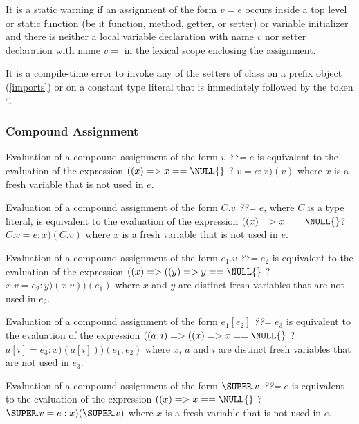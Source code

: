 \documentclass{article}
\begin{document}
\begin{itemize}

\LMHash{}
It is a static warning if an assignment of the form $v = e$ occurs inside a top level or static function (be it function, method, getter, or setter) or variable initializer and there is neither a local variable declaration with name $v$  nor setter declaration with name $v=$ in the lexical scope enclosing the assignment.

\LMHash{}
It is a compile-time error to invoke any of the setters of class  on a prefix object (\ref{imports}) or on a constant type literal that is  immediately followed by the token `.'.



\subsubsection{Compound Assignment}

\LMHash{}
Evaluation of a compound assignment of the form $v$ {\em ??=} $e$ is equivalent to the evaluation of the expression  $((x) => x == \NULL{}$ ?  $v=e : x)(v)$ where $x$ is a fresh variable that is not used in $e$.

\LMHash{}
Evaluation of a compound assignment of the form $C.v$ {\em ??=} $e$, where $C$ is a type literal, is equivalent to the evaluation of the expression  $((x) => x == \NULL{}$?  $C.v=e: x)(C.v)$ where $x$ is a fresh variable that is not used in $e$.


\LMHash{}
Evaluation of a compound assignment of the form $e_1.v$ {\em ??=} $e_2$ is equivalent to the evaluation of the expression  $((x) =>((y) => y == \NULL{}$ ? $ x.v = e_2: y)(x.v))(e_1)$ where $x$ and $y$ are distinct fresh variables that are not used in $e_2$.

\LMHash{}
Evaluation of a compound assignment of the form  $e_1[e_2]$  {\em ??=} $e_3$ is equivalent to the evaluation of the expression
$((a, i) => ((x) => x == \NULL{}$ ?  $a[i] = e_3: x)(a[i]))(e_1, e_2)$ where $x$, $a$ and $i$ are distinct fresh variables that are not used in $e_3$.

\LMHash{}
Evaluation of a compound assignment of the form $\SUPER.v$  {\em ??=} $e$ is equivalent to the evaluation of the expression  $((x) => x == \NULL{}$ ? $\SUPER.v = e: x)(\SUPER.v)$ where $x$ is a fresh variable that is not used in $e$.


\end{itemize}
\end{document}
